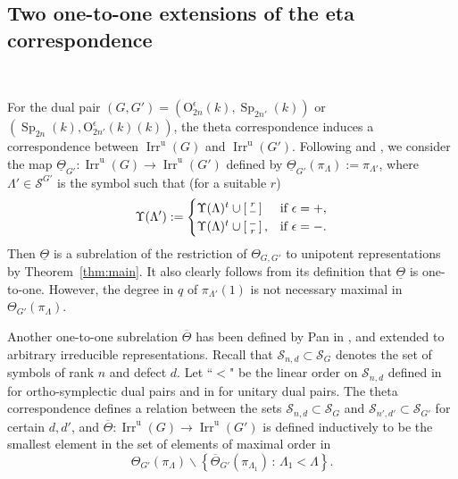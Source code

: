 \documentclass[12pt]{amsart}
\numberwithin{equation}{subsection}
\newcommand{\cS}{\mathcal{S}}
\newcommand{\unip}{\mathrm{u}}
\newcommand{\Irr}{\operatorname{Irr}}
\newcommand{\Sp}{\operatorname{Sp}}
\def\rO{{\mathrm{O}}}
\begin{document}
\subsection{Two one-to-one extensions of the eta correspondence}\

For the dual pair $(G,G')=(\rO_{2n}^\epsilon(k),\Sp_{2n'}(k))$ or $(\Sp_{2n}(k),\rO_{2n'}^\epsilon(k)(k))$, the theta correspondence induces a correspondence between $\Irr^\unip(G)$ and $\Irr^\unip(G')$.
Following \cite{AKP2} and \cite{Epequin}, we consider  the map
$\underline{\Theta}_{G'}\colon\Irr^\unip(G)\longrightarrow \Irr^\unip(G')$ defined by $\underline{\Theta}_{G'}(\pi_\Lambda):=\pi_{\Lambda'}$, where $\Lambda'\in\cS^{G'}$ is the symbol such that (for a suitable $r$)
\begin{equation}
\Upsilon(\Lambda'):=\begin{cases}
\Upsilon(\Lambda)^t\cup \left[\begin{smallmatrix}r\cr -\end{smallmatrix}\right]&\text{if $\epsilon=+$},\cr
\Upsilon(\Lambda)^t\cup \left[\begin{smallmatrix}-\cr r\end{smallmatrix}\right] ,&\text{if $\epsilon=-$}.
\end{cases}
\end{equation}
Then  $\underline{\Theta}$ is a subrelation of  the restriction of $\Theta_{G,G'}$ to unipotent representations by Theorem~\ref{thm:main}. It also clearly follows from its definition that $\underline{\Theta}$ is one-to-one.
However, the degree in $q$ of $\pi_{\Lambda'}(1)$ is not necessary maximal  in $\Theta_{G'}(\pi_\Lambda)$. 

Another one-to-one subrelation $\overline{\Theta}$ has been defined by Pan in \cite{Pan-eta-SpO, PanUU}, and extended to arbitrary irreducible representations. Recall that $\cS_{n,d}\subset \cS_G$ denotes 
the set of symbols of rank $n$ and defect $d$. Let ``$<$" be the linear order  on  $\cS_{n,d}$ defined in \cite[\S4.3]{Pan-eta-SpO} for ortho-symplectic dual pairs and in \cite[\S3.3]{PanUU} for unitary dual pairs. 
The theta correspondence defines a relation between the sets $\cS_{n,d}\subset \cS_G$ and  $\cS_{n',d'}\subset \cS_{G'}$ for certain $d,d'$, and $\overline{\Theta}\colon\Irr^\unip(G)\longrightarrow \Irr^\unip(G')$ 
is defined inductively to be the smallest element in the set of elements of maximal order in
\[\Theta_{G'}(\pi_\Lambda)\backslash\left\{\overline{\Theta}_{G'}(\pi_{\Lambda_1})\,:\,\Lambda_1<\Lambda\right\}.\]
\end{document}
